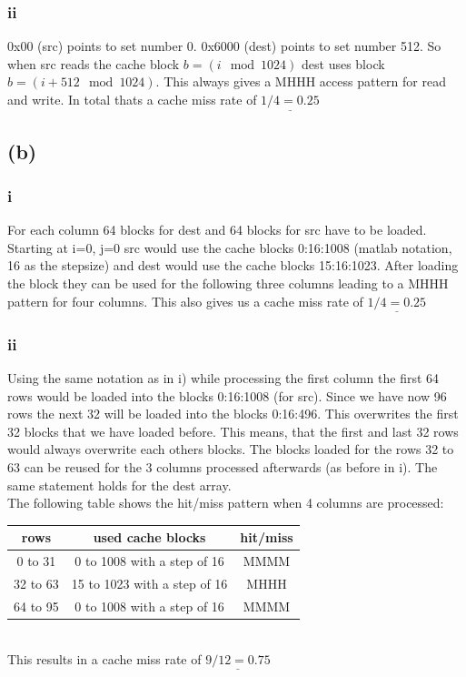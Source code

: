 \documentclass[10pt,a4paper,oneside,notitlepage]{report}
\begin{document}
\subsubsection*{ii}
0x00 (src) points to set number 0. 0x6000 (dest) points to set number 512.
So when src reads the cache block $b=(i \mod 1024)$ dest uses block $b=(i+512 \mod 1024)$. This always gives a MHHH access pattern for read and write. In total thats a cache miss rate of $\underline{1/4=0.25}$

\subsection*{(b)}
\subsubsection*{i}
For each column 64 blocks for dest and 64 blocks for src have to be loaded. Starting at i=0, j=0 src would use the cache blocks 0:16:1008 (matlab notation, 16 as the stepsize) and dest would use the cache blocks 15:16:1023. After loading the block they can be used for the following three columns leading to a MHHH pattern for four columns. This also gives us a cache miss rate of $\underline{1/4=0.25}$

\subsubsection*{ii}
Using the same notation as in i) while processing the first column the first 64 rows would be loaded into the blocks 0:16:1008 (for src). Since we have now 96 rows the next 32 will be loaded into the blocks 0:16:496. This overwrites the first 32 blocks that we have loaded before.   This means, that the first and last 32 rows would always overwrite each others blocks. The blocks loaded for the rows 32 to 63 can be reused for the 3 columns processed afterwards (as before in i). The same statement holds for the dest array.\\
The following table shows the hit/miss pattern when 4 columns are processed:\\
\begin{tabular}{|c|c|c|}
\hline 
\rowcolor{gray!30}
\textbf{rows}  & \textbf{used cache blocks} & \textbf{hit/miss} \\ 
\hline 
0 to 31 & 0 to 1008 with a step of 16 & MMMM \\ 
\hline 
32 to 63 & 15 to 1023 with a step of 16 & MHHH \\ 
\hline 
64 to 95 & 0 to 1008 with a step of 16 & MMMM \\ 
\hline 
\end{tabular}  \\
This results in a cache miss rate of $\underline{9/12=0.75}$
\end{document}
